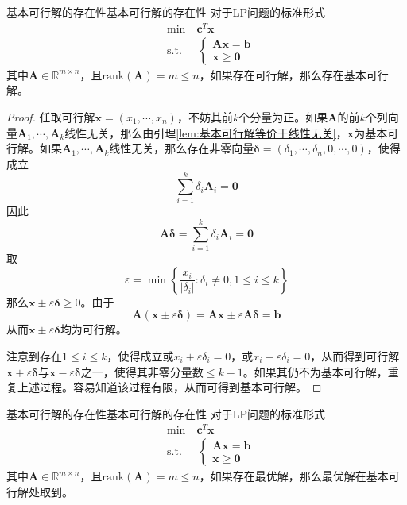 \documentclass[lang = cn, scheme = chinese, thmcnt = section]{elegantbook}
\newcommand{\R}{\mathbb{R}}            %
\newcommand{\bs}{\boldsymbol}          %
\begin{document}
\begin{theorem}{基本可行解的存在性}{基本可行解的存在性}
	对于LP问题的标准形式
	\begin{align*}
		& \text{min}  \quad \bs{c}^T\bs{x}\\
		& \text{s.t.} \;\, \quad \begin{cases}
			\bs{A} \bs{x} = \bs{b}\\
			\bs{x} \ge \bs{0}
		\end{cases}
	\end{align*}
	其中$\bs{A}\in\R^{m\times n}$，且$\text{rank}(\bs{A})=m\le n$，如果存在可行解，那么存在基本可行解。
\end{theorem}

\begin{proof}
	任取可行解$\bs{x}=(x_1,\cdots,x_n)$，不妨其前$k$个分量为正。如果$\bs{A}$的前$k$个列向量$\bs{A}_1,\cdots,\bs{A}_k$线性无关，那么由引理\ref{lem:基本可行解等价于线性无关}，$\bs{x}$为基本可行解。如果$\bs{A}_1,\cdots,\bs{A}_k$线性无关，那么存在非零向量$\bs{\delta}=(\delta_1,\cdots,\delta_n,0,\cdots,0)$，使得成立
	$$
	\sum_{i=1}^{k}\delta_i\bs{A}_i=\bs{0}
	$$
	因此
	$$
	\bs{A\delta}=\sum_{i=1}^{k}\delta_i\bs{A}_i=\bs{0}
	$$
	取
	$$
	\varepsilon=\min\left\{ \frac{x_i}{|\delta_i|}:\delta_i\ne 0,1\le i\le k \right\}
	$$
	那么$\bs{x}\pm\varepsilon\bs{\delta}\ge 0$。由于
	$$
	\bs{A}(\bs{x}\pm\varepsilon\bs{\delta})
	=\bs{A}\bs{x}\pm \varepsilon\bs{A}\bs{\delta}
	=\bs{b}
	$$
	从而$\bs{x}\pm\varepsilon\bs{\delta}$均为可行解。
	
	注意到存在$1\le i\le k$，使得成立或$x_i+\varepsilon\delta_i=0$，或$x_i-\varepsilon\delta_i=0$，从而得到可行解$\bs{x}+\varepsilon\bs{\delta}$与$\bs{x}-\varepsilon\bs{\delta}$之一，使得其非零分量数$\le k-1$。如果其仍不为基本可行解，重复上述过程。容易知道该过程有限，从而可得到基本可行解。
\end{proof}

\begin{theorem}{基本可行解的存在性}{基本可行解的存在性}
	对于LP问题的标准形式
	\begin{align*}
		& \text{min}  \quad \bs{c}^T\bs{x}\\
		& \text{s.t.} \;\, \quad \begin{cases}
			\bs{A} \bs{x} = \bs{b}\\
			\bs{x} \ge \bs{0}
		\end{cases}
	\end{align*}
	其中$\bs{A}\in\R^{m\times n}$，且$\text{rank}(\bs{A})=m\le n$，如果存在最优解，那么最优解在基本可行解处取到。
\end{theorem}
\end{document}
